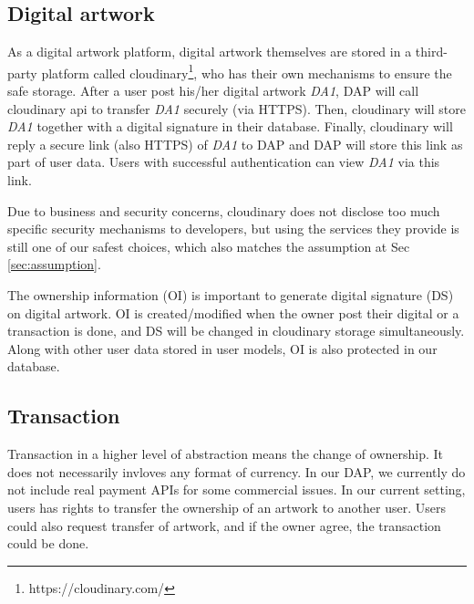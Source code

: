 \subsection{Digital artwork}

As a digital artwork platform, digital artwork themselves are stored in a third-party platform called cloudinary\footnote{https://cloudinary.com/}, who has their own mechanisms to ensure the safe storage. After a user post his/her digital artwork \textit{DA1}, DAP will call cloudinary api to transfer \textit{DA1} securely (via HTTPS). Then, cloudinary will store \textit{DA1} together with a digital signature in their database. Finally, cloudinary will reply a secure link (also HTTPS) of \textit{DA1} to DAP and DAP will store this link as part of user data. Users with successful authentication can view \textit{DA1} via this link. \par

Due to business and security concerns, cloudinary does not disclose too much specific security mechanisms to developers, but using the services they provide is still one of our safest choices, which also matches the assumption at Sec \ref{sec:assumption}.

The ownership information (OI) is important to generate digital signature (DS) on digital artwork. OI is created/modified when the owner post their digital or a transaction is done, and DS will be changed in cloudinary storage simultaneously.  Along with other user data stored in user models, OI is also protected in our database.

\subsection{Transaction}
Transaction in a higher level of abstraction means the change of ownership. It does not necessarily invloves any format of currency. In our DAP, we currently do not include real payment APIs for some commercial issues. In our current setting, users has rights to transfer the ownership of an artwork to another user. Users could also request transfer of artwork, and if the owner agree, the transaction could be done.
